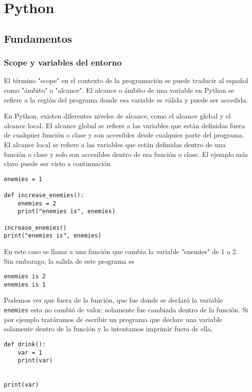 \chapter{Python}

\section{Fundamentos}

\subsection{Scope y variables del entorno}

El término "scope" en el contexto de la programación se puede traducir al
español como "ámbito" o "alcance". El alcance o ámbito de una variable en
Python se refiere a la región del programa donde esa variable es válida y puede
ser accedida.

En Python, existen diferentes niveles de alcance, como el alcance global y el
alcance local. El alcance global se refiere a las variables que están definidas
fuera de cualquier función o clase y son accesibles desde cualquier parte del
programa. El alcance local se refiere a las variables que están definidas
dentro de una función o clase y solo son accesibles dentro de esa función o
clase. El ejemplo más claro puede ser visto a continuación

\begin{verbatim}
enemies = 1

def increase_enemies():
    enemies = 2
    print("enemies is", enemies)

increase_enemies()
print("enemies is", enemies)
\end{verbatim}

En este caso se llama a una función que cambia la variable "enemies" de 1 a 2.
Sin embarago, la salida de este programa es

\begin{verbatim}
enemies is 2
enemies is 1
\end{verbatim}

Podemos ver que fuera de la función, que fue donde se declaró la variable
\texttt{enemies} esta no cambió de valor; solamente fue cambiada dentro de la
función. Si por ejemplo tratáramos de escribir un programa que declare una
variable solamente dentro de la función y la intentamos imprimir fuera de ella,

\begin{verbatim}
def drink():
    var = 1
    print(var)


print(var)
\end{verbatim}

